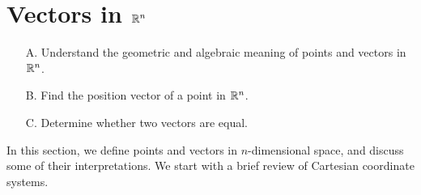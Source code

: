 \section{Vectors in $\mathbb{R}^n$}

\begin{outcome}

\begin{enumerate}
\item[A.] Understand the geometric and algebraic meaning of points and
  vectors in $\mathbb{R}^n$.
\item[B.] Find the position vector of a point in $\mathbb{R}^n$.
\item[C.] Determine whether two vectors are equal.
\end{enumerate}
\end{outcome}

In this section, we define points and vectors in $n$-dimensional
space, and discuss some of their interpretations. We start with a
brief review of Cartesian coordinate systems.
\bigskip

